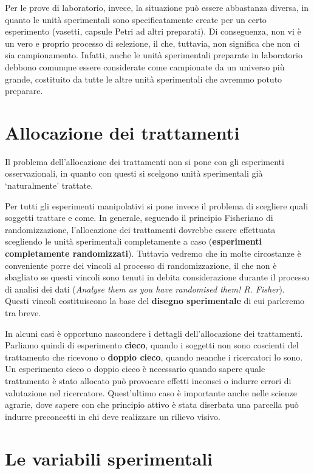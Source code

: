 \documentclass[
  12pt,
]{book}
\begin{document}
Per le prove di laboratorio, invece, la situazione può essere abbastanza diversa, in quanto le unità sperimentali sono specificatamente create per un certo esperimento (vasetti, capsule Petri ad altri preparati). Di conseguenza, non vi è un vero e proprio processo di selezione, il che, tuttavia, non significa che non ci sia campionamento. Infatti, anche le unità sperimentali preparate in laboratorio debbono comunque essere considerate come campionate da un universo più grande, costituito da tutte le altre unità sperimentali che avremmo potuto preparare.

\hypertarget{allocazione-dei-trattamenti}{%
\section{Allocazione dei trattamenti}\label{allocazione-dei-trattamenti}}

Il problema dell'allocazione dei trattamenti non si pone con gli esperimenti osservazionali, in quanto con questi si scelgono unità sperimentali già `naturalmente' trattate.

Per tutti gli esperimenti manipolativi si pone invece il problema di scegliere quali soggetti trattare e come. In generale, seguendo il principio Fisheriano di randomizzazione, l'allocazione dei trattamenti dovrebbe essere effettuata scegliendo le unità sperimentali completamente a caso (\textbf{esperimenti completamente randomizzati}). Tuttavia vedremo che in molte circostanze è conveniente porre dei vincoli al processo di randomizzazione, il che non è sbagliato se questi vincoli sono tenuti in debita considerazione durante il processo di analisi dei dati (\emph{Analyse them as you have randomised them! R. Fisher}). Questi vincoli costituiscono la base del \textbf{disegno sperimentale} di cui parleremo tra breve.

In alcuni casi è opportuno nascondere i dettagli dell'allocazione dei trattamenti. Parliamo quindi di esperimento \textbf{cieco}, quando i soggetti non sono coscienti del trattamento che ricevono o \textbf{doppio cieco}, quando neanche i ricercatori lo sono. Un esperimento cieco o doppio cieco è necessario quando sapere quale trattamento è stato allocato può provocare effetti inconsci o indurre errori di valutazione nel ricercatore. Quest'ultimo caso è importante anche nelle scienze agrarie, dove sapere con che principio attivo è stata diserbata una parcella può indurre preconcetti in chi deve realizzare un rilievo visivo.

\hypertarget{le-variabili-sperimentali}{%
\section{Le variabili sperimentali}\label{le-variabili-sperimentali}}
\end{document}
